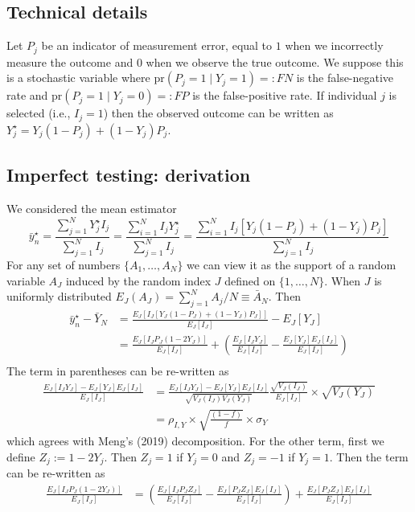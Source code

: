 \documentclass[12pt]{article}
\def\pr{\text{pr}}
\begin{document}
\subsection*{Technical details}

Let $P_j$ be an indicator of measurement error, equal to $1$ when we incorrectly measure the outcome and $0$ when we observe the true outcome. We suppose this is a stochastic variable where $\pr(P_j = 1 \mid Y_j = 1) =: FN$ is the false-negative rate and $\pr(P_j = 1 \mid Y_j = 0) =: FP$ is the false-positive rate.  If individual $j$ is selected (i.e., $I_j = 1$) then the observed outcome can be written as $Y_j^{\star} = Y_j(1-P_j) + (1-Y_j) P_j$.

\subsection*{Imperfect testing: derivation}
\label{app:imperfect}
We considered the mean estimator
$$
\bar y_n^\star = \frac{\sum_{j=1}^N Y_j^\star I_j}{\sum_{j=1}^N I_j} = \frac{\sum_{i=1}^N  I_j Y_j^\star }{\sum_{j=1}^N  I_j } = \frac{\sum_{i=1}^N  I_j \left[ Y_j (1-P_j) + (1-Y_j) P_j \right]}{\sum_{j=1}^N  I_j }
$$
For any set of numbers $\{ A_1, \ldots, A_N \}$ we can view it as the support of a random variable $A_J$ induced by the random index $J$ defined on $\{1,\ldots, N\}$.  When $J$ is uniformly distributed $E_J (A_J) = \sum_{j=1}^N A_j / N \equiv \bar A_N$. Then
$$
\begin{aligned}
\bar y_n^\star  - \bar Y_N &= \frac{E_J \left[ I_J \left[ Y_J (1-P_J) + (1-Y_J) P_J \right] \right]}{E_J [ I_J ] } - E_J[Y_J] \\
&= \frac{E_J \left[ I_J P_J (1-2Y_J) \right]}{E_J [ I_J ] } + \left( \frac{E_J [I_J Y_J]}{E_J [ I_J ] } - \frac{E_J[Y_J] E_J[I_J]}{E_J[I_J]} \right) \\
\end{aligned}
$$
The term in parentheses can be re-written as
$$
\begin{aligned}
\frac{E_J [I_J Y_J]- E_J[Y_J] E_J[I_J]}{E_J[I_J]} &=  \frac{E_J [I_J Y_J]- E_J[Y_J] E_J[I_J]}{\sqrt{V_J(I_J) V_J(Y_J)}} \frac{\sqrt{V_J(I_J)}}{E_J[I_J]} \times \sqrt{V_J(Y_J)} \\
&= \rho_{I,Y} \times \sqrt{\frac{(1-f)}{f}} \times \sigma_Y
\end{aligned}
$$
which agrees with Meng's (2019) decomposition. For the other term, first we define $Z_j := 1 - 2 Y_j $. Then $Z_j = 1$ if $Y_j = 0$ and $Z_j = -1$ if $Y_j = 1$. Then the term can be re-written as
$$
\begin{aligned}
\frac{E_J \left[ I_J P_J (1-2Y_J) \right]}{E_J [ I_J ] } &= \left( \frac{E_J \left[ I_J P_J Z_J \right]}{E_J [ I_J ] } -  \frac{E_J \left[ P_J Z_J \right] E_J[ I_J]}{E_J [ I_J ] } \right) +  \frac{E_J \left[ P_J Z_J \right] E_J[ I_J]}{E_J [ I_J ] } \\
\end{aligned}
$$
\end{document}
